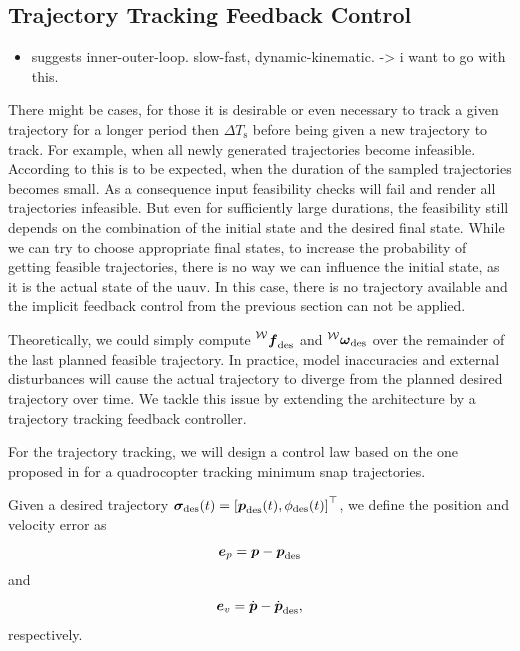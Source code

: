 \subsection{Trajectory Tracking Feedback Control}
\begin{itemize}
	\item \cite{Maurya09} suggests inner-outer-loop. slow-fast, dynamic-kinematic. -> i want to go with this.
\end{itemize}
There might be cases, for those it is desirable or even necessary to track a given trajectory for a longer period then $\Delta T_{\text{s}}$ before being given a new trajectory to track.
For example, when all newly generated trajectories become infeasible. According to \cite{MuellerHehn15} this is to be expected, when the duration of the sampled trajectories becomes small.
As a consequence input feasibility checks will fail and render all trajectories infeasible.
But even for sufficiently large durations, the feasibility still depends on the combination of the initial state and the desired final state.
While we can try to choose appropriate final states, to increase the probability of getting feasible trajectories, there is no way we can influence the initial state, as it is the actual state of the \ac{uauv}.
In this case, there is no trajectory available and the implicit feedback control from the previous section can not be applied.

Theoretically, we could simply compute $\thrustdesiredworld$ and $\vangdesiredworld$ over the remainder of the last planned feasible trajectory.
In practice, model inaccuracies and external disturbances will cause the actual trajectory to diverge from the planned desired trajectory over time.
We tackle this issue by extending the architecture by a trajectory tracking feedback controller.

For the trajectory tracking, we will design a control law based on the one proposed in \cite{MellingerKumar11} for a quadrocopter tracking minimum snap trajectories.

Given a desired trajectory $\bm{\sigma}_{\text{des}}(t) = \left[\mbox{$\bm{p}$}_{\text{des}}(t), \phi_{\text{des}}(t)\right]^\top$, we define the position and velocity error as
\begin{equation}
	\mbox{$\bm{e}$}_{p} = \mbox{$\bm{p}$} - \mbox{$\bm{p}$}_{\text{des}}
\end{equation}
and
\begin{equation}
	\mbox{$\bm{e}$}_{v} = \mbox{$\dot{\bm{p}}$} - \mbox{$\dot{\bm{p}}$}_{\text{des}}
	,
\end{equation}
respectively.

